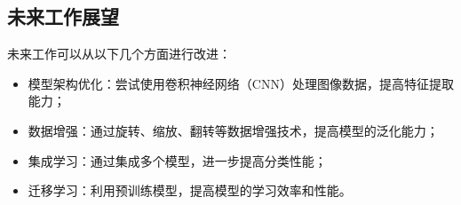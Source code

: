 \documentclass[UTF8]{article}
\begin{document}
\subsection{未来工作展望}
未来工作可以从以下几个方面进行改进：
\begin{itemize}[topsep=0pt, partopsep=0pt, itemsep=0pt, parsep=0pt]
    \item 模型架构优化：尝试使用卷积神经网络（CNN）处理图像数据，提高特征提取能力；
    \item 数据增强：通过旋转、缩放、翻转等数据增强技术，提高模型的泛化能力；
    \item 集成学习：通过集成多个模型，进一步提高分类性能；
    \item 迁移学习：利用预训练模型，提高模型的学习效率和性能。
\end{itemize}



\end{document}
